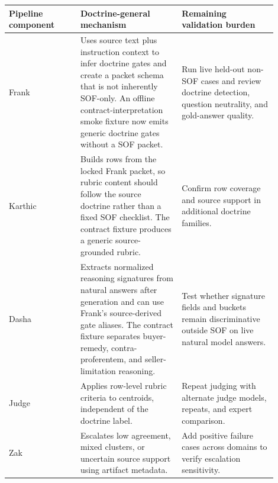 \begin{tabular}{p{0.24\linewidth}p{0.34\linewidth}p{0.32\linewidth}}
\toprule
Pipeline component & Doctrine-general mechanism & Remaining validation burden \\
\midrule
Frank & Uses source text plus instruction context to infer doctrine gates and create a packet schema that is not inherently SOF-only. An offline contract-interpretation smoke fixture now emits generic doctrine gates without a SOF packet. & Run live held-out non-SOF cases and review doctrine detection, question neutrality, and gold-answer quality. \\
Karthic & Builds rows from the locked Frank packet, so rubric content should follow the source doctrine rather than a fixed SOF checklist. The contract fixture produces a generic source-grounded rubric. & Confirm row coverage and source support in additional doctrine families. \\
Dasha & Extracts normalized reasoning signatures from natural answers after generation and can use Frank's source-derived gate aliases. The contract fixture separates buyer-remedy, contra-proferentem, and seller-limitation reasoning. & Test whether signature fields and buckets remain discriminative outside SOF on live natural model answers. \\
Judge & Applies row-level rubric criteria to centroids, independent of the doctrine label. & Repeat judging with alternate judge models, repeats, and expert comparison. \\
Zak & Escalates low agreement, mixed clusters, or uncertain source support using artifact metadata. & Add positive failure cases across domains to verify escalation sensitivity. \\
\bottomrule
\end{tabular}
